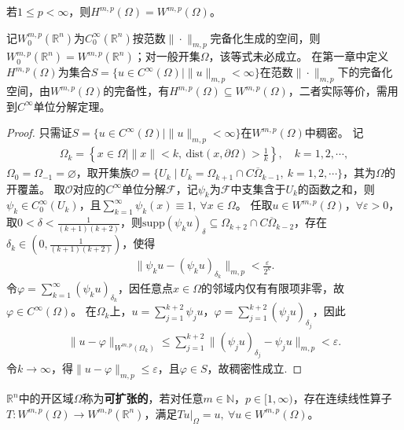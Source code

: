 \documentclass[../../main.tex]{subfiles}%
\begin{document}
\begin{theorem}
若$1\leqslant p<\infty$，则$H^{m,p}(\Omega)=W^{m,p}(\Omega)$。
\end{theorem}
\begin{remark}
记$W_{0}^{m,p}(\mathbb{R}^{n})$为$C_{0}^{\infty}(\mathbb{R}^{n})$按范数$\|\cdot\|_{m,p}$完备化生成的空间，则$W_{0}^{m,p}(\mathbb{R}^{n})=W^{m,p}(\mathbb{R}^{n})$；对一般开集$\Omega$，该等式未必成立。
在第一章中定义$H^{m,p}(\Omega)$为集合$S=\{u\in C^{\infty}(\Omega)\mid\|u\|_{m,p}<\infty\}$在范数$\|\cdot\|_{m,p}$下的完备化空间，由$W^{m,p}(\Omega)$的完备性，有$H^{m,p}(\Omega)\subseteq W^{m,p}(\Omega)$，二者实际等价，需用到$C^{\infty}$单位分解定理。
\end{remark}
\begin{proof}
只需证$S=\{u\in C^{\infty}(\Omega)\mid\|u\|_{m,p}<\infty\}$在$W^{m,p}(\Omega)$中稠密。
记
\begin{align*}
\Omega_{k}=\left\{x\in\Omega\mid\|x\|<k,\ \mathrm{dist}(x,\partial\Omega)>\frac{1}{k}\right\},\quad k=1,2,\cdots,
\end{align*}
$\Omega_{0}=\Omega_{-1}=\varnothing $，取开集族$\mathscr{O}=\{U_{k}\mid U_{k}=\Omega_{k+1}\cap C\overline{\Omega}_{k-1},\ k=1,2,\cdots\}$，其为$\Omega$的开覆盖。
取$\mathscr{O}$对应的$C^{\infty}$单位分解$\mathscr{F}$，记$\psi_{k}$为$\mathscr{F}$中支集含于$U_{k}$的函数之和，则$\psi_{k}\in C_{0}^{\infty}(U_{k})$，且$\sum\limits_{k=1}^{\infty}\psi_{k}(x)\equiv 1,\ \forall x\in\Omega$。
任取$u\in W^{m,p}(\Omega)$，$\forall\varepsilon>0$，取$0<\delta<\frac{1}{(k+1)(k+2)}$，则$\mathrm{supp}(\psi_{k}u)_{\delta}\subseteq\Omega_{k+2}\cap C\overline{\Omega}_{k-2}$，存在$\delta_{k}\in\left(0,\frac{1}{(k+1)(k+2)}\right)$，使得
\begin{align*}
\|\psi_{k}u-(\psi_{k}u)_{\delta_{k}}\|_{m,p}<\frac{\varepsilon}{2^{k}}.
\end{align*}
令$\varphi=\sum\limits_{k=1}^{\infty}(\psi_{k}u)_{\delta_{k}}$，因任意点$x\in\Omega$的邻域内仅有有限项非零，故$\varphi\in C^{\infty}(\Omega)$。
在$\Omega_{k}$上，$u=\sum\limits_{j=1}^{k+2}\psi_{j}u$，$\varphi=\sum\limits_{j=1}^{k+2}(\psi_{j}u)_{\delta_{j}}$，因此
\begin{align*}
\|u-\varphi\|_{W^{m,p}(\Omega_{k})}\leqslant\sum\limits_{j=1}^{k+2}\|(\psi_{j}u)_{\delta_{j}}-\psi_{j}u\|_{m,p}<\varepsilon.
\end{align*}
令$k\to\infty$，得$\|u-\varphi\|_{m,p}\leqslant\varepsilon$，且$\varphi\in S$，故稠密性成立.
\end{proof}

\begin{definition}
$\mathbb{R}^{n}$中的开区域$\Omega$称为\textbf{可扩张的}，若对任意$m\in\mathbb{N}$，$p\in[1,\infty)$，存在连续线性算子$T:W^{m,p}(\Omega)\to W^{m,p}(\mathbb{R}^{n})$，满足$Tu|_{\Omega}=u,\ \forall u\in W^{m,p}(\Omega)$。
\end{definition}
\end{document}
